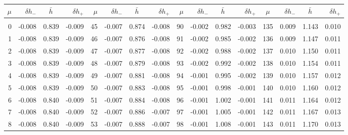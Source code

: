 \newpage
\begin{table}\centering
\small{ \begin{tabular}{rrrr|rrrr|rrrr|crrr}
$\mu$ & $\delta h_-$  & $\bar{h}~~~~$ & $\delta h_+$ &
$\mu$ & $\delta h_-$  & $\bar{h}~~~~$ & $\delta h_+$ &
$\mu$ & $\delta h_-$  & $\bar{h}~~~~$ & $\delta h_+$ &
$\mu$ & $\delta h_-$  & $\bar{h}~~~~$ & $\delta h_+$ \\\hline
&&&&&&&&&&&&&&&\\[-1.75ex]
  0 & \tiny{ -0.008} &   0.839 & \tiny{ -0.009} &  45 & \tiny{ -0.007} &   0.874 & \tiny{ -0.008} &  90 & \tiny{ -0.002} &   0.982 & \tiny{ -0.003} & 135 & \tiny{  0.009} &   1.143 & \tiny{  0.010}\\
  1 & \tiny{ -0.008} &   0.839 & \tiny{ -0.009} &  46 & \tiny{ -0.007} &   0.876 & \tiny{ -0.008} &  91 & \tiny{ -0.002} &   0.985 & \tiny{ -0.002} & 136 & \tiny{  0.009} &   1.147 & \tiny{  0.011}\\
  2 & \tiny{ -0.008} &   0.839 & \tiny{ -0.009} &  47 & \tiny{ -0.007} &   0.877 & \tiny{ -0.008} &  92 & \tiny{ -0.002} &   0.988 & \tiny{ -0.002} & 137 & \tiny{  0.010} &   1.150 & \tiny{  0.011}\\
  3 & \tiny{ -0.008} &   0.839 & \tiny{ -0.009} &  48 & \tiny{ -0.007} &   0.879 & \tiny{ -0.008} &  93 & \tiny{ -0.002} &   0.992 & \tiny{ -0.002} & 138 & \tiny{  0.010} &   1.154 & \tiny{  0.011}\\
  4 & \tiny{ -0.008} &   0.839 & \tiny{ -0.009} &  49 & \tiny{ -0.007} &   0.881 & \tiny{ -0.008} &  94 & \tiny{ -0.001} &   0.995 & \tiny{ -0.002} & 139 & \tiny{  0.010} &   1.157 & \tiny{  0.012}\\
  5 & \tiny{ -0.008} &   0.839 & \tiny{ -0.009} &  50 & \tiny{ -0.007} &   0.883 & \tiny{ -0.008} &  95 & \tiny{ -0.001} &   0.998 & \tiny{ -0.001} & 140 & \tiny{  0.010} &   1.160 & \tiny{  0.012}\\
  6 & \tiny{ -0.008} &   0.840 & \tiny{ -0.009} &  51 & \tiny{ -0.007} &   0.884 & \tiny{ -0.008} &  96 & \tiny{ -0.001} &   1.002 & \tiny{ -0.001} & 141 & \tiny{  0.011} &   1.164 & \tiny{  0.012}\\
  7 & \tiny{ -0.008} &   0.840 & \tiny{ -0.009} &  52 & \tiny{ -0.007} &   0.886 & \tiny{ -0.007} &  97 & \tiny{ -0.001} &   1.005 & \tiny{ -0.001} & 142 & \tiny{  0.011} &   1.167 & \tiny{  0.013}\\
  8 & \tiny{ -0.008} &   0.840 & \tiny{ -0.009} &  53 & \tiny{ -0.007} &   0.888 & \tiny{ -0.007} &  98 & \tiny{ -0.001} &   1.008 & \tiny{ -0.001} & 143 & \tiny{  0.011} &   1.170 & \tiny{  0.013}\\

\end{tabular}}
\end{table}
